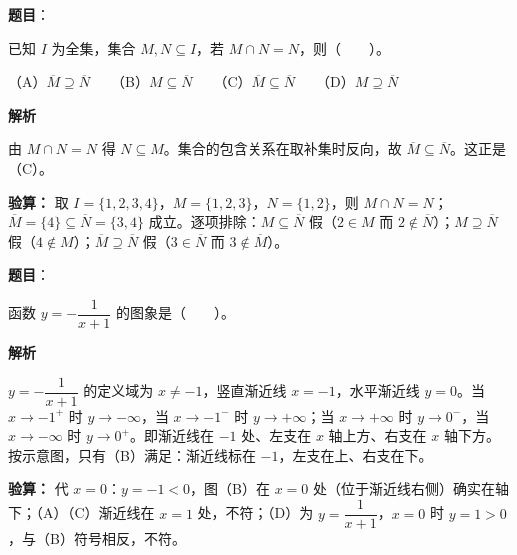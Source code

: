 

\begin{answer}

\textbf{题目}：

已知 $I$ 为全集，集合 $M,N\subseteq I$，若 $M\cap N=N$，则\mbox{（　　）}。

（A）$\overline{M}\supseteq\overline{N}$　　（B）$M\subseteq\overline{N}$　　（C）$\overline{M}\subseteq\overline{N}$　　（D）$M\supseteq\overline{N}$

\textbf{解析}

由 $M\cap N=N$ 得 $N\subseteq M$。集合的包含关系在取补集时反向，故 $\overline{M}\subseteq\overline{N}$。这正是（C）。

\textbf{验算：} 取 $I=\{1,2,3,4\}$，$M=\{1,2,3\}$，$N=\{1,2\}$，则 $M\cap N=N$；$\overline{M}=\{4\}\subseteq\overline{N}=\{3,4\}$ 成立。逐项排除：$M\subseteq\overline{N}$ 假（$2\in M$ 而 $2\notin\overline{N}$）；$M\supseteq\overline{N}$ 假（$4\notin M$）；$\overline{M}\supseteq\overline{N}$ 假（$3\in\overline{N}$ 而 $3\notin\overline{M}$）。


\par\medskip

\end{answer}
\begin{answer}

\textbf{题目}：

函数 $y=-\dfrac{1}{x+1}$ 的图象是\mbox{（　　）}。
\nopagebreak[4]
\begin{center}\end{center}
\nopagebreak[4]
\textbf{解析}

$y=-\dfrac{1}{x+1}$ 的定义域为 $x\ne-1$，竖直渐近线 $x=-1$，水平渐近线 $y=0$。当 $x\to-1^{+}$ 时 $y\to-\infty$，当 $x\to-1^{-}$ 时 $y\to+\infty$；当 $x\to+\infty$ 时 $y\to0^{-}$，当 $x\to-\infty$ 时 $y\to0^{+}$。即渐近线在 $-1$ 处、左支在 $x$ 轴上方、右支在 $x$ 轴下方。按示意图，只有（B）满足：渐近线标在 $-1$，左支在上、右支在下。

\textbf{验算：} 代 $x=0$：$y=-1<0$，图（B）在 $x=0$ 处（位于渐近线右侧）确实在轴下；（A）（C）渐近线在 $x=1$ 处，不符；（D）为 $y=\dfrac{1}{x+1}$，$x=0$ 时 $y=1>0$，与（B）符号相反，不符。


\par\medskip

\end{answer}
